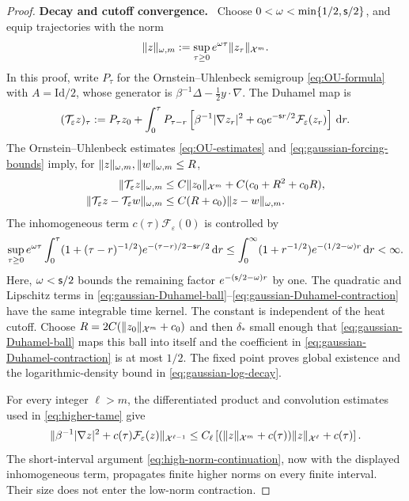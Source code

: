 \documentclass[11pt,reqno]{amsart}
\numberwithin{equation}{section}
\theoremstyle{plain}
\theoremstyle{remark}
\DeclarePairedDelimiter{\norm}{\lVert}{\rVert}
\newcommand{\parheading}[1]{\par\medskip\noindent\textbf{#1}\ }
\newcommand{\Xspace}{\mathcal X}
\newcommand{\Id}{\mathrm{Id}}
\begin{document}
\begin{proof}
\parheading{Decay and cutoff convergence.}
Choose $0<\omega<\min\{1/2,\mathsf{s}/2\}$, and equip trajectories with the norm
\begin{equation}\label{eq:gaussian-trajectory-norm}
 \norm z_{\omega,m}:=\sup_{\tau\ge0}e^{\omega\tau}\norm{z_\tau}_{\Xspace^m}.
\end{equation}
In this proof, write $P_\tau$ for the Ornstein--Uhlenbeck semigroup \eqref{eq:OU-formula} with $A=\Id/2$, whose generator is $\beta^{-1}\Delta-\tfrac12y\cdot\nabla$. The Duhamel map is
\begin{equation}\label{eq:gaussian-Duhamel}
 (\mathcal T_\varepsilon z)_\tau
 :=P_\tau z_0+
   \int_0^\tau P_{\tau-r}
       \left[\beta^{-1}|\nabla z_r|^2+c_0e^{-\mathsf{s} r/2}\mathcal F_\varepsilon(z_r)\right]\,\mathrm d r.
\end{equation}
The Ornstein--Uhlenbeck estimates \eqref{eq:OU-estimates} and \eqref{eq:gaussian-forcing-bounds} imply, for $\norm z_{\omega,m},\norm w_{\omega,m}\le R$,
\begin{align}
 \norm{\mathcal T_\varepsilon z}_{\omega,m}
 &\le C\norm{z_0}_{\Xspace^m}+C(c_0+R^2+c_0R),
       \label{eq:gaussian-Duhamel-ball}\\
 \norm{\mathcal T_\varepsilon z-\mathcal T_\varepsilon w}_{\omega,m}
 &\le C(R+c_0)\norm{z-w}_{\omega,m}.
       \label{eq:gaussian-Duhamel-contraction}
\end{align}
The inhomogeneous term $c(\tau)\mathcal F_\varepsilon(0)$ is controlled by
\begin{equation}\label{eq:gaussian-time-integrability}
 \sup_{\tau\ge0}e^{\omega\tau}\int_0^\tau(1+(\tau-r)^{-1/2})e^{-(\tau-r)/2-\mathsf{s} r/2}\,\mathrm d r
 \le\int_0^\infty(1+r^{-1/2})e^{-(1/2-\omega)r}\,\mathrm d r<\infty.
\end{equation}
Here, $\omega<\mathsf{s}/2$ bounds the remaining factor $e^{-(\mathsf{s}/2-\omega)r}$ by one. The quadratic and Lipschitz terms in \eqref{eq:gaussian-Duhamel-ball}--\eqref{eq:gaussian-Duhamel-contraction} have the same integrable time kernel.
The constant is independent of the heat cutoff. Choose $R=2C(\norm{z_0}_{\Xspace^m}+c_0)$ and then $\delta_*$ small enough that \eqref{eq:gaussian-Duhamel-ball} maps this ball into itself and the coefficient in \eqref{eq:gaussian-Duhamel-contraction} is at most $1/2$. The fixed point proves global existence and the logarithmic-density bound in \eqref{eq:gaussian-log-decay}.

For every integer $\ell>m$, the differentiated product and convolution estimates used in \eqref{eq:higher-tame} give
\begin{equation}\label{eq:gaussian-higher-tame}
 \norm{\beta^{-1}|\nabla z|^2+c(\tau)\mathcal F_\varepsilon(z)}_{\Xspace^{\ell-1}}
 \le C_\ell\left[(\norm z_{\Xspace^m}+c(\tau))\norm z_{\Xspace^\ell}+c(\tau)\right].
\end{equation}
The short-interval argument \eqref{eq:high-norm-continuation}, now with the displayed inhomogeneous term, propagates finite higher norms on every finite interval. Their size does not enter the low-norm contraction.


\end{proof}
\end{document}
